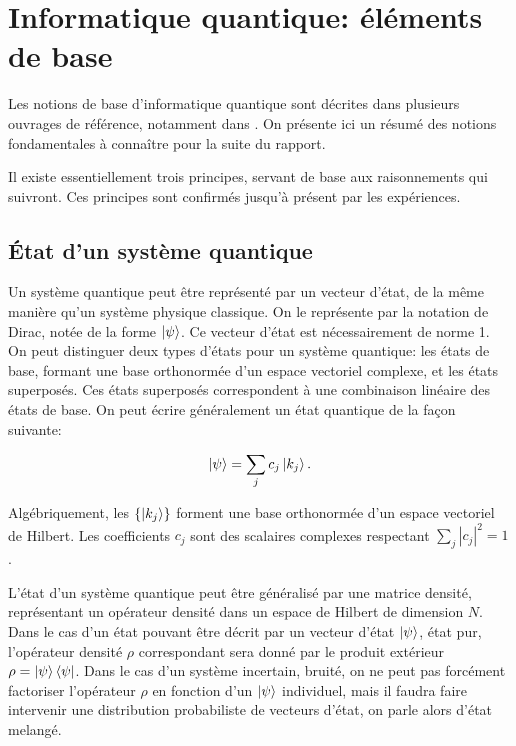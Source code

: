 \chapter{Informatique quantique: éléments de base}


Les notions de base d'informatique quantique sont décrites dans plusieurs ouvrages de référence, notamment dans \cite{Nielsen00, Mermin07}. On présente ici un résumé des notions fondamentales à connaître pour la suite du rapport.


Il existe essentiellement trois principes, servant de base aux raisonnements qui suivront. Ces principes sont confirmés jusqu'à présent par les expériences.

\section{\'Etat d'un système quantique}
\label{postulat:1}
Un système quantique peut être représenté par un vecteur d'état, de la même manière qu'un système physique classique. On le représente par la notation de Dirac, notée de la forme $\ket{\psi}$. Ce vecteur d'état est nécessairement de norme 1. On peut distinguer deux types d'états pour un système quantique: les états de base, formant une base orthonormée d'un espace vectoriel complexe, et les états superposés. Ces états superposés correspondent à une combinaison linéaire des états de base. On peut écrire généralement un état quantique de la façon suivante:

\begin{equation}
    \ket{\psi} = \displaystyle\sum_{j} c_j \ket{k_j}.
\end{equation}

Algébriquement, les $\{\ket{k_j}\}$ forment une base orthonormée d'un espace vectoriel de Hilbert. Les coefficients $c_j$ sont des scalaires complexes respectant $ \displaystyle\sum_{j} |c_j|^2 = 1$.


\medbreak

L'état d'un système quantique peut être généralisé par une matrice densité, représentant un opérateur densité dans un espace de Hilbert de dimension $N$. Dans le cas d'un état pouvant être décrit par un vecteur d'état $\ket{\psi}$, état pur, l'opérateur densité $\rho$ correspondant sera donné par le produit extérieur $\rho = \ket{\psi} \bra{\psi}$. Dans le cas d'un système incertain, bruité, on ne peut pas forcément factoriser l'opérateur $\rho$ en fonction d'un $\ket{\psi}$ individuel, mais il faudra faire intervenir une distribution probabiliste de vecteurs d'état, on parle alors d'état melangé. 

